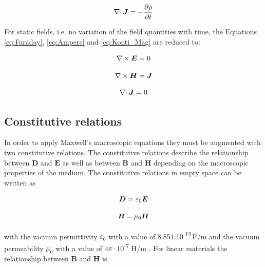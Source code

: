 \begin{equation}
\label{eq:Konti_Mag}
\centering
\nabla\cdotp\boldsymbol{J} = -\frac{\partial\rho}{\partial t}
\end{equation}

For static fields, i.e. no variation of the field quantities with time, the Equations \ref{eq:Faraday}, \ref{eq:Ampere} and \ref{eq:Konti_Mag} are reduced to:

\begin{equation}
\label{eq:Faraday_stat}
\centering
\nabla\times\boldsymbol{E} = 0
\end{equation}

\begin{equation}
\label{eq:Ampere_stat}
\centering
\nabla\times\boldsymbol{H} = \boldsymbol{J} 
\end{equation}

\begin{equation}
\label{eq:Konti_Mag_stat}
\centering
\nabla\cdotp\boldsymbol{J} = 0
\end{equation}

\subsection{Constitutive relations}
\label{subsec:const_rel}

In order to apply Maxwell's macroscopic equations they must be augmented with two constitutive relations. The constitutive relations describe the relationship between $\boldsymbol{D}$ and $\boldsymbol{E}$ as well as between $\boldsymbol{B}$ and $\boldsymbol{H}$ depending on the macroscopic properties of the medium. The constitutive relations in empty space can be written as

\begin{equation}
\label{eq:disp_const_rel}
\centering
\boldsymbol{D} = \varepsilon_{0}\boldsymbol{E} 
\end{equation}

\begin{equation}
\label{eq:B_vac}
\centering
\boldsymbol{B} = \mu_{0}\boldsymbol{H}
\end{equation}

with the vacuum permittivity $\varepsilon_{0}$ with a value of 8.854$\cdotp$10\textsuperscript{-12}\,F/m and the vacuum permeability $\mu_{0}$ with a value of 4$\pi\cdotp$10\textsuperscript{-7} H/m \cite{monk2003finite}. For linear materials the relationship between $\boldsymbol{B}$ and $\boldsymbol{H}$ is   

